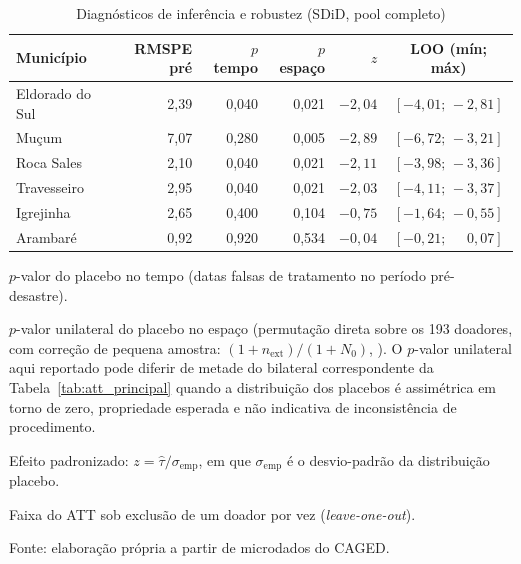 \documentclass[a4paper,12pt]{article}
\begin{document}
\begin{table}[htbp]
\centering
\caption{Diagnósticos de inferência e robustez (SDiD, pool completo)}
\label{tab:robustez}
\begin{threeparttable}
\small
\begin{tabular}{l r r r r c}
\toprule
Município & RMSPE pré & $p$ tempo\tnote{a} & $p$ espaço\tnote{b} & $z$\tnote{c} & LOO (mín; máx)\tnote{d} \\
\midrule
Eldorado do Sul & 2,39 & 0,040 & 0,021 & $-2{,}04$ & $[-4{,}01;\,-2{,}81]$ \\
Mu\c{c}um        & 7,07 & 0,280 & 0,005 & $-2{,}89$ & $[-6{,}72;\,-3{,}21]$ \\
Roca Sales      & 2,10 & 0,040 & 0,021 & $-2{,}11$ & $[-3{,}98;\,-3{,}36]$ \\
Travesseiro     & 2,95 & 0,040 & 0,021 & $-2{,}03$ & $[-4{,}11;\,-3{,}37]$ \\
Igrejinha       & 2,65 & 0,400 & 0,104 & $-0{,}75$ & $[-1{,}64;\,-0{,}55]$ \\
Arambaré        & 0,92 & 0,920 & 0,534 & $-0{,}04$ & $[-0{,}21;\,\phantom{-}0{,}07]$ \\
\bottomrule
\end{tabular}
\begin{tablenotes}[flushleft]
\footnotesize
\item[a] $p$-valor do placebo no tempo (datas falsas de tratamento no período pré-desastre).
\item[b] $p$-valor unilateral do placebo no espaço (permutação direta sobre os 193 doadores, com correção de pequena amostra: $(1 + n_{\text{ext}})/(1 + N_0)$, \citeauthor{north2002}). O $p$-valor unilateral aqui reportado pode diferir de metade do bilateral correspondente da Tabela~\ref{tab:att_principal} quando a distribuição dos placebos é assimétrica em torno de zero, propriedade esperada e não indicativa de inconsistência de procedimento.
\item[c] Efeito padronizado: $z = \hat{\tau} / \sigma_{\text{emp}}$, em que $\sigma_{\text{emp}}$ é o desvio-padrão da distribuição placebo.
\item[d] Faixa do ATT sob exclusão de um doador por vez (\textit{leave-one-out}).
\item Fonte: elaboração própria a partir de microdados do CAGED.
\end{tablenotes}
\end{threeparttable}
\end{table}
\end{document}
